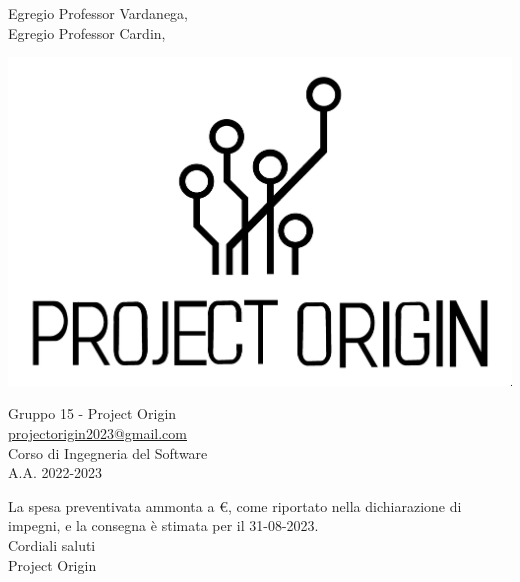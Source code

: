 \documentclass[12pt]{letter}
\begin{document}
    \begin{letter}{Egregio Professor Vardanega,\\Egregio Professor Cardin,}
        \begin{minipage}{.4\textwidth}
            \begin{flushleft}
            \end{flushleft}
        \end{minipage}
        \begin{minipage}{.5\textwidth}
            \begin{flushright}
                \includegraphics[width=.4\linewidth]{../../../template/images/logo.png}
            \end{flushright}
        \end{minipage}
        {    
        \begin{flushleft}
            Gruppo 15 - Project Origin\\ \href{mailto:projectorigin2023@gmail.com}{projectorigin2023@gmail.com}\\Corso di Ingegneria del Software\\A.A. 2022-2023
        \end{flushleft}
        }
        La spesa preventivata ammonta a  \euro, come riportato nella dichiarazione di impegni, e la consegna è stimata per il 31-08-2023.\\
        {Cordiali saluti\\Project Origin}
    \end{letter}
\end{document}
